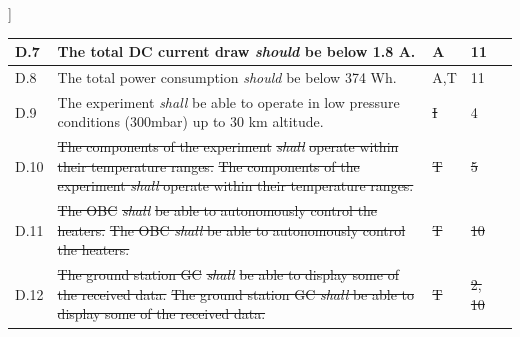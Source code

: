 ]\documentclass[a4paper,12pt,twoside]{article}
\providecommand{\DIFaddtex}[1]{{\protect\color{blue}\uwave{#1}}} %
\providecommand{\DIFdeltex}[1]{{\protect\color{red}\sout{#1}}}                      %
\providecommand{\DIFaddbegin}{} %
\providecommand{\DIFaddend}{} %
\providecommand{\DIFdelbegin}{} %
\providecommand{\DIFdelend}{} %
\providecommand{\DIFadd}[1]{\texorpdfstring{\DIFaddtex{#1}}{#1}} %
\providecommand{\DIFdel}[1]{\texorpdfstring{\DIFdeltex{#1}}{}} %
\newcommand{\DIFscaledelfig}{0.5}
\newlength{\DIFdelgraphicswidth} %
\newlength{\DIFdelgraphicsheight} %
\newcommand{\DIFaddincludegraphics}[2][]{{\color{blue}\fbox{\DIFOincludegraphics[#1]{#2}}}} %
\newcommand{\DIFdelincludegraphics}[2][]{%
\sbox{\DIFdelgraphicsbox}{\DIFOincludegraphics[#1]{#2}}%
\settoboxwidth{\DIFdelgraphicswidth}{\DIFdelgraphicsbox} %
\settoboxtotalheight{\DIFdelgraphicsheight}{\DIFdelgraphicsbox} %
\scalebox{\DIFscaledelfig}{%
\parbox[b]{\DIFdelgraphicswidth}{\usebox{\DIFdelgraphicsbox}\\[-\baselineskip] \rule{\DIFdelgraphicswidth}{0em}}\llap{\resizebox{\DIFdelgraphicswidth}{\DIFdelgraphicsheight}{%
\setlength{\unitlength}{\DIFdelgraphicswidth}%
\begin{picture}(1,1)%
\thicklines\linethickness{2pt} %
{\color[rgb]{1,0,0}\put(0,0){\framebox(1,1){}}}%
{\color[rgb]{1,0,0}\put(0,0){\line( 1,1){1}}}%
{\color[rgb]{1,0,0}\put(0,1){\line(1,-1){1}}}%
\end{picture}%
}\hspace*{3pt}}} %
} %
\DeclareRobustCommand{\DIFaddbegin}{\DIFOaddbegin \let\includegraphics\DIFaddincludegraphics} %
\DeclareRobustCommand{\DIFaddend}{\DIFOaddend \let\includegraphics\DIFOincludegraphics} %
\DeclareRobustCommand{\DIFdelbegin}{\DIFOdelbegin \let\includegraphics\DIFdelincludegraphics} %
\DeclareRobustCommand{\DIFdelend}{\DIFOaddend \let\includegraphics\DIFOincludegraphics} %
\begin{document}
\begin{longtable}[]{|m{}| m{} |m{} |m{}|m{}|}
D.7  & The total DC current draw \textit{should} be below 1.8 A.                                                                                                                        &      A\DIFaddbegin \DIFadd{, T        }\DIFaddend & 11            &        \\ \hline
D.8  & The total power consumption \textit{should} be below 374 Wh.                                                                                                                      &       A,T       & 11            &        \\ \hline
D.9  & The experiment \textit{shall} be able to operate in low pressure conditions (300mbar) up to 30 km altitude.                                                                                       &      \DIFdelbegin \DIFdel{I        }\DIFdelend \DIFaddbegin \DIFadd{A, T        }\DIFaddend &  4\DIFaddbegin \DIFadd{, 18           }\DIFaddend &        \\ \hline
D.10 & \DIFdelbegin \DIFdel{The components of the experiment }\textit{\DIFdel{shall}} %
\DIFdel{operate within their temperature ranges.                                                                                         }\DIFdelend \DIFaddbegin \st{The components of the experiment \textit{shall} operate within their temperature ranges.}\DIFadd{\textsuperscript{\ref{fn:unnecessary-requirement}}                                                                                          }\DIFaddend &       \DIFdelbegin \DIFdel{T       }\DIFdelend \DIFaddbegin \DIFadd{-     }\DIFaddend & \DIFdelbegin \DIFdel{5            }\DIFdelend \DIFaddbegin \DIFadd{-           }\DIFaddend &        \\  \hline
D.11 & \DIFdelbegin \DIFdel{The OBC }\textit{\DIFdel{shall}} %
\DIFdel{be able to autonomously control the heaters.                                                                                                              }\DIFdelend \DIFaddbegin \st{The OBC \textit{shall} be able to autonomously control the heaters.}\DIFadd{\textsuperscript{\ref{fn:unnecessary-requirement}}                                                                                                               }\DIFaddend &        \DIFdelbegin \DIFdel{T     }\DIFdelend \DIFaddbegin \DIFadd{-    }\DIFaddend &  \DIFdelbegin \DIFdel{10            }\DIFdelend \DIFaddbegin \DIFadd{-            }\DIFaddend &        \\ \hline
D.12 & \DIFdelbegin \DIFdel{The ground station GC }\textit{\DIFdel{shall}} %
\DIFdel{be able to display some of the received data.                                                                                               }\DIFdelend \DIFaddbegin \st{The ground station GC \textit{shall} be able to display some of the received data.}\DIFadd{\textsuperscript{\ref{fn:unnecessary-requirement}}                                                                                                }\DIFaddend &      \DIFdelbegin \DIFdel{T        }\DIFdelend \DIFaddbegin \DIFadd{-       }\DIFaddend & \DIFdelbegin \DIFdel{2, 10            }\DIFdelend \DIFaddbegin \DIFadd{-           }\DIFaddend &        \\ \hline

\end{longtable}
\end{document}
